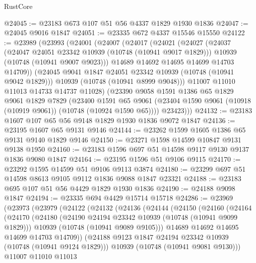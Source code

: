 \begin{lexlean}{RustCore}
\begin{coremodule}
@24045 := @23183 @673 @107 @51 @56 @4337 @1829 @1930 @1836
@24047 := @24045 @9016 @1847
@24051 := @23335 @672 @4337 @15546 @15550
@24122 := @23989
    (@23993
      (@24001
        (@24007
          (@24017
            (@24021
              (@24027
                (@24037
                  (@24047 @24051 @23342 @10939 (@10748 (@10941 @9017 @1829)))
                  @10939
                  (@10748 (@10941 @9007 @9023)))
                @14689
                @14692
                @14695
                @14699
                @14703
                @14709))
            (@24045 @9041 @1847 @24051 @23342 @10939 (@10748 (@10941 @9042 @1829)))
            @10939
            (@10748 (@10941 @8999 @9048)))
          @11007
          @11010
          @11013
          @14733
          @14737
          @11028)
        (@23390
          @9058
          @1591
          @1386
          @65
          @1829
          @9061
          @1829
          @7829
          (@23400
            @1591
            @65
            @9061
            (@23404 @1590 @9061 (@10918 (@10919 @9061)) (@10748 (@10924 @1590 @65))))
          @23423)))
@24132 := @23183 @1607 @107 @65 @56 @9148 @1829 @1930 @1836 @9072 @1847
@24136 := @23195 @1607 @65 @9131 @9146
@24144 := @23262 @1599 @1605 @1386 @65 @9131 @9140 @1829 @9146
@24150 := @23271 @1598 @14599 @10847 @9131 @9138 @1950
@24160 := @23183 @1596 @697 @51 @14598 @9117 @9130 @9137 @1836 @9080 @1847
@24164 := @23195 @1596 @51 @9106 @9115
@24170 := @23292 @1595 @14599 @51 @9106 @9113 @3874
@24180 := @23299 @697 @51 @14598 @8613 @9105 @9112 @1836 @9088 @1847 @23321
@24188 := @23183 @695 @107 @51 @56 @4429 @1829 @1930 @1836
@24190 := @24188 @9098 @1847
@24194 := @23335 @694 @4429 @15714 @15718
@24286 := @23969
    (@23973
      (@23979
        (@24122
          (@24132
            (@24136
              (@24144
                (@24150
                  (@24160
                    (@24164
                      (@24170
                        (@24180
                          (@24190 @24194 @23342 @10939 (@10748 (@10941 @9099 @1829)))
                          @10939
                          (@10748 (@10941 @9089 @9105)))
                        @14689
                        @14692
                        @14695
                        @14699
                        @14703
                        @14709))
                    (@24188 @9123 @1847 @24194 @23342 @10939 (@10748 (@10941 @9124 @1829)))
                    @10939
                    (@10748 (@10941 @9081 @9130)))
                  @11007
                  @11010
                  @11013

\end{coremodule}
\end{lexlean}
